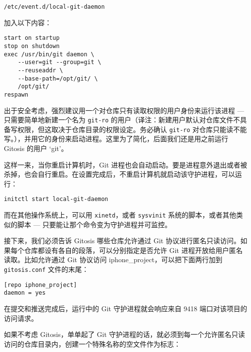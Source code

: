 \documentclass[a4paper]{book}
\begin{document}
\begin{shaded}\begin{verbatim}
/etc/event.d/local-git-daemon
\end{verbatim}\end{shaded}

加入以下内容：

\begin{shaded}\begin{verbatim}
start on startup
stop on shutdown
exec /usr/bin/git daemon \
    --user=git --group=git \
    --reuseaddr \
    --base-path=/opt/git/ \
    /opt/git/
respawn
\end{verbatim}\end{shaded}

出于安全考虑，强烈建议用一个对仓库只有读取权限的用户身份来运行该进程 --- 只需要简单地新建一个名为 \texttt{git-ro} 的用户（译注：新建用户默认对仓库文件不具备写权限，但这取决于仓库目录的权限设定。务必确认 \texttt{git-ro} 对仓库只能读不能写。），并用它的身份来启动进程。这里为了简化，后面我们还是用之前运行 Gitosis 的用户 `git'。

这样一来，当你重启计算机时，Git 进程也会自动启动。要是进程意外退出或者被杀掉，也会自行重启。在设置完成后，不重启计算机就启动该守护进程，可以运行：

\begin{shaded}\begin{verbatim}
initctl start local-git-daemon
\end{verbatim}\end{shaded}

而在其他操作系统上，可以用 \texttt{xinetd}，或者 \texttt{sysvinit} 系统的脚本，或者其他类似的脚本 --- 只要能让那个命令变为守护进程并可监控。

接下来，我们必须告诉 Gitosis 哪些仓库允许通过 Git 协议进行匿名只读访问。如果每个仓库都设有各自的段落，可以分别指定是否允许 Git 进程开放给用户匿名读取。比如允许通过 Git 协议访问 iphone\_project，可以把下面两行加到 \texttt{gitosis.conf} 文件的末尾：

\begin{shaded}\begin{verbatim}
[repo iphone_project]
daemon = yes
\end{verbatim}\end{shaded}

在提交和推送完成后，运行中的 Git 守护进程就会响应来自 9418 端口对该项目的访问请求。

如果不考虑 Gitosis，单单起了 Git 守护进程的话，就必须到每一个允许匿名只读访问的仓库目录内，创建一个特殊名称的空文件作为标志：
\end{document}
